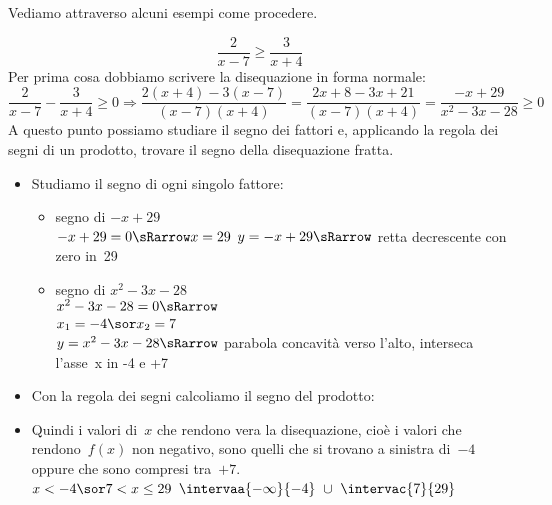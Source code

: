 Vediamo attraverso alcuni esempi come procedere.

\begin{esempio}
 \[\frac{2}{x-7} \ge \frac{3}{x+4}\]
Per prima cosa dobbiamo scrivere la disequazione in forma normale:
 \[\frac{2}{x-7} - \frac{3}{x+4} \ge 0 \Rightarrow 
   \frac{2(x+4) - 3(x-7)}{(x-7)(x+4)} = 
   \frac{2 x +8 -3x +21}{(x-7)(x+4)} =
   \frac{-x +29}{x^2-3x-28} \ge 0\]
A questo punto possiamo studiare il segno dei fattori e, applicando la regola 
dei segni di un prodotto, trovare il segno della disequazione fratta.

\begin{itemize}
 \item Studiamo il segno di ogni singolo fattore:

\begin{itemize}

 \item  segno di \(-x +29\)\\
 \segnofatt
   {\(-x +29=0 \sRarrow x=29\)}
   {\(y=-x +29 \sRarrow \)}
   {retta decrescente con zero in~29}
   {}
 \item segno di \(x^2-3x-28\)\\
 \segnofatt
   {\(x^2-3x-28=0 \sRarrow \) \\
  \(x_1=-4 \sor x_2=7\)}
   {\\ \(y=x^2-3x-28 \sRarrow\)}
   {parabola concavità verso l'alto, interseca l'asse~x in -4 e +7}
   {}
\end{itemize}
 \item Con la regola dei segni calcoliamo il segno del prodotto:
\begin{inaccessibleblock}
  \begin{center}
  \segnofrazionea
  \end{center}
\end{inaccessibleblock}
 \item 
 Quindi i valori di~\(x\) che rendono vera la disequazione, cioè 
i valori  che rendono~\(f(x)\) non negativo, sono quelli 
  che si trovano a sinistra di~\(-4\) oppure che sono compresi 
  tra~\(+7\).\\
 \insiemesoluzione
   {\solfrazionea}
   {\(x < -4 \sor 7 < x \le 29\)}
   {\(\intervaa{-\infty}{-4}~\cup~\intervac{7}{29}\)}
\end{itemize}
\end{esempio}

